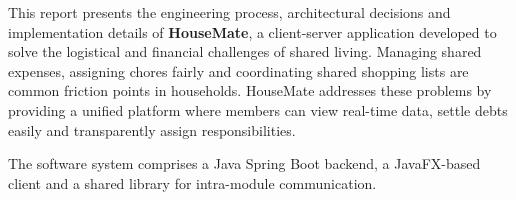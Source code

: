 This report presents the engineering process, architectural decisions and implementation details of \textbf{HouseMate}, a client-server application developed to solve the logistical and financial challenges of shared living. Managing shared expenses, assigning chores fairly and coordinating shared shopping lists are common friction points in households. HouseMate addresses these problems by providing a unified platform where members can view real-time data, settle debts easily and transparently assign responsibilities. 

The software system comprises a Java Spring Boot backend, a JavaFX-based client and a shared library for intra-module communication.